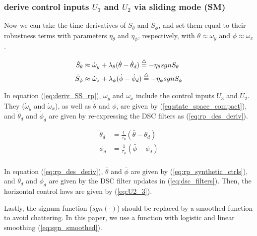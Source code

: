 \documentclass[journal,11pt,onecolumn,draftclsnofoot,]{IEEEtran}
\begin{document}
\subsubsection{derive control inputs $U_3$ and $U_2$ via sliding mode (SM)}
Now we can take the time derivatives of $S_\theta$ and $S_\phi$, and set them equal to their robustness terms with parameters $\eta_\theta$ and $\eta_\phi$, respectively, with $\ddot{\theta} \approx \dot{\omega}_y$ and $\ddot{\phi} \approx \dot{\omega}_x$.

\begin{equation}
\label{eq:deriv_SS_rp}
\begin{split}
\dot{S}_\theta &\approx \dot{\omega}_y + \lambda_\theta ( \dot{\theta} - \dot{\theta}_d ) \buildrel\triangle\over =-\eta_\theta sgn S_\theta \\
\dot{S}_\phi &\approx \dot{\omega}_x + \lambda_\phi ( \dot{\phi} - \dot{\phi}_d ) \buildrel\triangle\over =-\eta_\phi sgn S_\phi \\
\end{split}
\end{equation}

In equation (\ref{eq:deriv_SS_rp}), $\dot{\omega}_y$ and $\dot{\omega}_x$ include the control inputs $U_3$ and $U_2$. They ($\dot{\omega}_y$ and $\dot{\omega}_x$), as well as $\dot{\theta}$ and $\dot{\phi}$, are given by (\ref{eq:state_space_compact}), and $\dot{\theta}_d$ and $\dot{\phi}_d$ are given by re-expressing the DSC filters as (\ref{eq:rp_des_deriv}).

\begin{equation}
\label{eq:rp_des_deriv}
\begin{split}
\dot{\theta}_d &= \frac{1}{\tau_\theta} \left( \bar{\theta} - \theta_d \right)\\
\dot{\phi}_d   &= \frac{1}{\tau_\phi} \left( \bar{\phi} - \phi_d \right)\\
\end{split}
\end{equation}

In equation (\ref{eq:rp_des_deriv}), $\bar{\theta}$ and $\bar{\phi}$ are given by (\ref{eq:rp_synthetic_ctrls}), and $\theta_d$ and $\phi_d$ are given by the DSC filter updates in (\ref{eq:dsc_filters}). Then, the horizontal control laws are given by (\ref{eq:U2_3}).

Lastly, the signum function ($sgn(\cdot)$) should be replaced by a smoothed function to avoid chattering. In this paper, we use a function with logistic and linear smoothing (\ref{eq:sgn_smoothed}).
\end{document}
